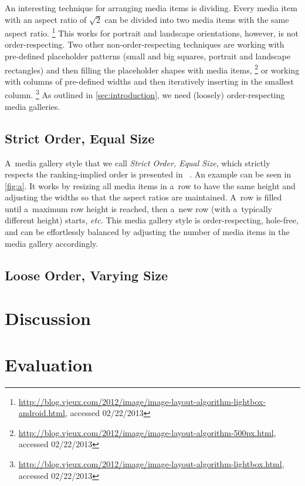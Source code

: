 \documentclass{sig-alternate}
\newcommand{\inlinelistingsize}{\fontsize{8pt}{11pt}}
\let\oldurl\url
\renewcommand{\url}[1]{\inlinelistingsize\oldurl{#1}}
\begin{document}
An interesting technique for arranging media items is dividing.
Every media item with an aspect ratio of $ \sqrt2 $ can be divided
into two media items with the same aspect ratio.%
\footnote{\url{http://blog.vjeux.com/2012/image/image-layout-algorithm-lightbox-android.html},
accessed 02/22/2013}
This works for portrait and landscape orientations,
however, is not order-respecting.
Two other non-order-respecting techniques are working
with pre-defined placeholder patterns
(small and big squares, portrait and landscape rectangles)
and then filling the placeholder shapes with media items,%
\footnote{\url{http://blog.vjeux.com/2012/image/image-layout-algorithm-500px.html},
accessed 02/22/2013}
or working with columns of pre-defined widths
and then iteratively inserting in the smallest column.%
\footnote{\url{http://blog.vjeux.com/2012/image/image-layout-algorithm-lightbox.html},
accessed 02/22/2013}
As outlined in \autoref{sec:introduction},
we need (loosely) order-respecting media galleries.

\subsection{Strict Order, Equal Size}

A~media gallery style that we call \emph{Strict Order, Equal Size},
which strictly respects the ranking-implied order is presented in~%
\cite{chedeau2012googleplus}.
An example can be seen in \autoref{fig:a}.
It works by resizing all media items in a~row to have the same height
and adjusting the widths so that the aspect ratios are maintained.
A~row is filled until a~maximum row height is reached,
then a~new row (with a~typically different height) starts, \emph{etc.}
This media gallery style is order-respecting, hole-free,
and can be effortlessly balanced by adjusting the number
of media items in the media gallery accordingly.
\subsection{Loose Order, Varying Size}
\cite{chedeau2012facebook}

\section{Discussion}

\section{Evaluation}
\end{document}
